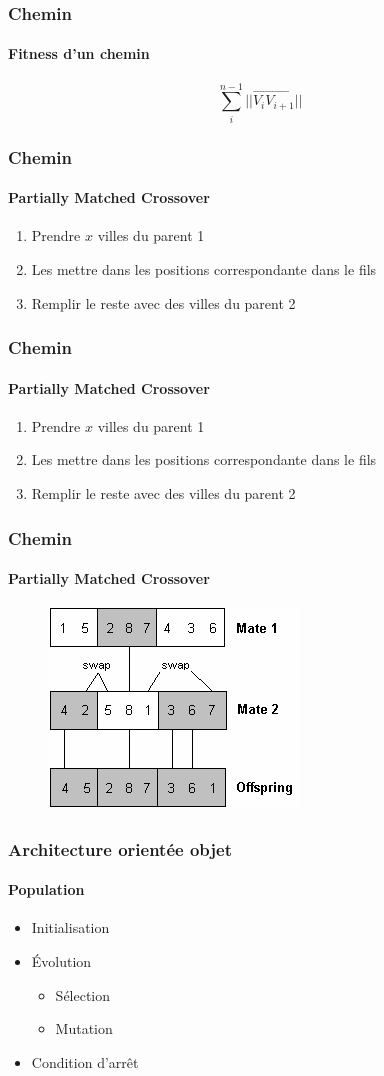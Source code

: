 \documentclass[16pt]{beamer}
\begin{document}
\begin{frame}
  \frametitle{Chemin}
  \framesubtitle{Fitness d'un chemin}
  \[
    \sum_{i}^{n-1} ||\overrightarrow{V_{i}V_{i+1}}||
  \]
\end{frame}

\begin{frame}
  \frametitle{Chemin}
  \framesubtitle{Partially Matched Crossover}
    \begin{enumerate}
      \item Prendre $x$ villes du parent 1
      \item Les mettre dans les positions correspondante dans le fils
      \item Remplir le reste avec des villes du parent 2
    \end{enumerate}
\end{frame}

\begin{frame}
  \frametitle{Chemin}
  \framesubtitle{Partially Matched Crossover}
    \begin{enumerate}
      \item Prendre $x$ villes du parent 1
      \item Les mettre dans les positions correspondante dans le fils
      \item Remplir le reste avec des villes du parent 2
    \end{enumerate}
\end{frame}

\begin{frame}
  \frametitle{Chemin}
  \framesubtitle{Partially Matched Crossover}
  \begin{figure}
    \includegraphics[scale=0.9]{pmx.png}
    \end{figure}
\end{frame}

\begin{frame}
  \frametitle{Architecture orientée objet}
  \framesubtitle{\textbf{Population}}
  \begin{itemize}
    \item Initialisation
    \item Évolution
      \begin{itemize}
        \item Sélection
        \item Mutation
      \end{itemize}
    \item Condition d'arrêt
  \end{itemize}
\end{frame}
\end{document}
